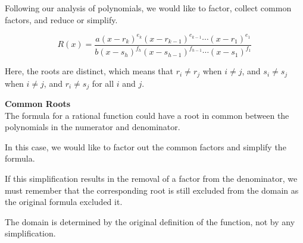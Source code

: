 \documentclass{ximera}
\begin{document}
Following our analysis of polynomials, we would like to factor, collect common factors, and reduce or simplify.


\[  R(x)  = \frac{a (x - r_k)^{e_k} (x - r_{k-1})^{e_{k-1}} \cdots (x - r_1)^{e_1} }{b (x - s_h)^{f_h} (x - s_{h-1})^{f_{h-1}} \cdots (x - s_1)^{f_1}}            \]


Here, the roots are distinct, which means that  $r_i \ne r_j$ when $i \ne j$, and $s_i \ne s_j$ when $i \ne j$, and $r_i \ne s_j$ for all $i$ and $j$.



\begin{warning}   \textbf{\textcolor{red!80!black}{Common Roots}} \\

The formula for a rational function could have a root in common between the polynomials in the numerator and denominator.

In this case, we would like to factor out the common factors and simplify the formula.

If this simplification results in the removal of a factor from the denominator, we must remember that the corresponding root is still excluded from the domain as the original formula excluded it.

The domain is determined by the original definition of the function, not by any simplification.

\end{warning}
\end{document}
